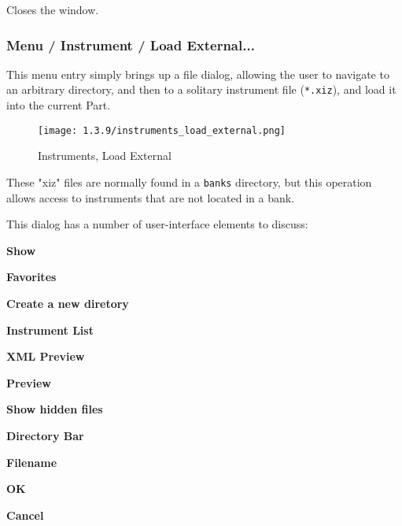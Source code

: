    Closes the window.

% 
% 

\subsubsection{Menu / Instrument / Load External...}
\label{subsubsec:menu_instrument_load}

   This menu entry simply brings up a file dialog, allowing the user to
   navigate to an arbitrary directory, and then to a solitary instrument file
   (\texttt{*.xiz}), and load it into the current Part.

\begin{figure}[H]
   \centering 
   \texttt{[image: 1.3.9/instruments\_load\_external.png]}
   \caption{Instruments, Load External}
   \label{fig:instruments_load_external}
\end{figure}

   These "xiz" files are normally found in a \texttt{banks} directory, but this
   operation allows access to instruments that are not located in a bank.

   This dialog has a number of user-interface elements to discuss:

   \begin{enumber}
      \item \textbf{Show}
      \item \textbf{Favorites}
      \item \textbf{Create a new diretory}
      \item \textbf{Instrument List}
      \item \textbf{XML Preview}
      \item \textbf{Preview}
      \item \textbf{Show hidden files}
      \item \textbf{Directory Bar}
      \item \textbf{Filename}
      \item \textbf{OK}
      \item \textbf{Cancel}
   \end{enumber}

